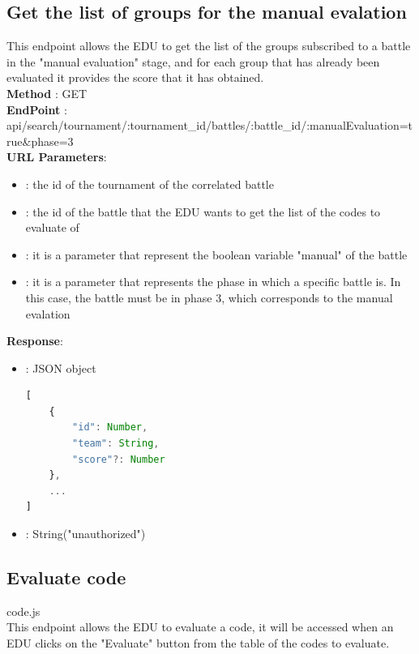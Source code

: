 \subsection*{Get the list of groups for the manual evalation}
This endpoint allows the EDU to get the list of the groups subscribed to a battle in the "manual evaluation" stage, and for each group that has already been evaluated it provides the score that it has obtained.\\
\textbf{Method} : GET \\
\textbf{EndPoint} : api/search/tournament/:tournament\_id/battles/:battle\_id/:manualEvaluation=true\&phase=3 \\
\textbf{URL Parameters}:
\begin{itemize}
    \item {} : the id of the tournament of the correlated battle
    \item {} : the id of the battle that the EDU wants to get the list of the codes to evaluate of
    \item {} : it is a parameter that represent the boolean variable "manual" of the battle
    \item {} : it is a parameter that represents the phase in which a specific battle is. In this case, the battle must be in phase 3, which corresponds to the manual evalation
\end{itemize}
\textbf{Response}:
\begin{itemize}
    \item {} : JSON object
          \begin{lstlisting}[language=JavaScript, label={lst:jscode}, basicstyle=\ttfamily]
[
    {
        "id": Number,
        "team": String,
        "score"?: Number
    },
    ...
]
        \end{lstlisting}
    \item {} : String("unauthorized")
\end{itemize}

\subsection*{Evaluate code}
code.js\\
This endpoint allows the EDU to evaluate a code, it will be accessed when an EDU clicks on the "Evaluate" button from the table of the codes to evaluate.\\


